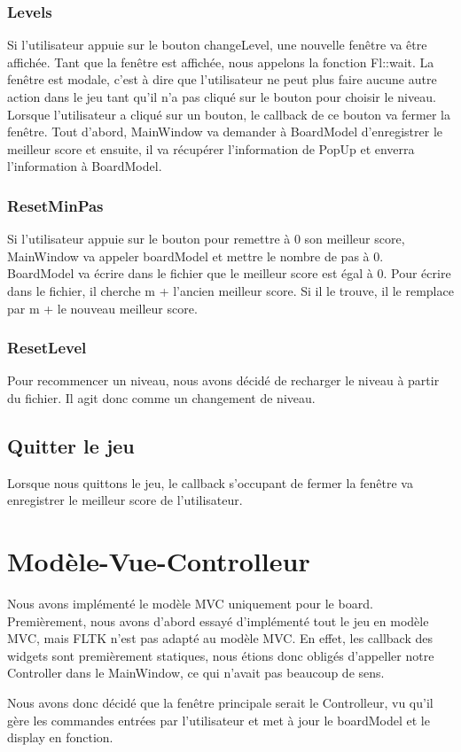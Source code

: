 \documentclass[utf8]{article}
\begin{document}
\begin{large}
\subsubsection{Levels}
\indent
\par
Si l'utilisateur appuie sur le bouton changeLevel, une nouvelle fenêtre va être
affichée. Tant que la fenêtre est affichée, nous appelons la fonction Fl::wait.
La fenêtre est modale, c'est à dire que l'utilisateur ne peut plus faire aucune
autre action dans le jeu tant qu'il n'a pas cliqué sur le bouton pour choisir le
niveau. Lorsque l'utilisateur a cliqué sur un bouton, le callback de ce bouton
va fermer la fenêtre. Tout d'abord, MainWindow va demander à BoardModel
d'enregistrer le meilleur score et ensuite, il va récupérer l'information de
PopUp et enverra l'information à BoardModel.
\par

\subsubsection{ResetMinPas}
\indent
\par
Si l'utilisateur appuie sur le bouton pour remettre à 0 son meilleur score,
MainWindow va appeler boardModel et mettre le nombre de pas à 0. BoardModel va
écrire dans le fichier que le meilleur score est égal à 0. Pour écrire dans le
fichier, il cherche m + l'ancien meilleur score. Si il le trouve, il le remplace
par m + le nouveau meilleur score.
\par

\subsubsection{ResetLevel}
Pour recommencer un niveau, nous avons décidé de recharger le niveau à partir du
fichier. Il agit donc comme un changement de niveau.
\subsection{Quitter le jeu}
\indent
\par
Lorsque nous quittons le jeu, le callback s'occupant de fermer la fenêtre va
enregistrer le meilleur score de l'utilisateur.
\par

\section{Modèle-Vue-Controlleur}
\indent
\par
Nous avons implémenté le modèle MVC uniquement pour le board. Premièrement, nous
avons d'abord essayé d'implémenté tout le jeu en modèle MVC, mais FLTK n'est pas
adapté au modèle MVC. En effet, les callback des widgets sont premièrement
statiques, nous étions donc obligés d'appeller notre Controller dans le
MainWindow, ce qui n'avait pas beaucoup de sens. 
\par
Nous avons donc décidé que la
fenêtre principale serait le Controlleur, vu qu'il gère les commandes entrées
par l'utilisateur et met à jour le boardModel  et le display en fonction.
\par

\end{large}
\end{document}
